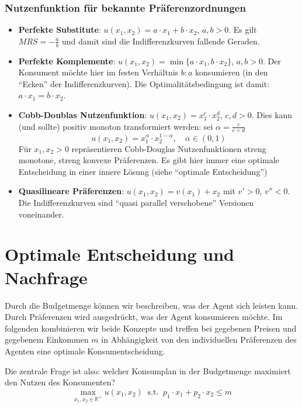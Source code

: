 \subsubsection*{Nutzenfunktion für bekannte Präferenzordnungen}
\begin{itemize}
	\item \textbf{Perfekte Substitute}: $u(x_1, x_2) = a \cdot x_1 + b \cdot x_2$, $a, b > 0$. Es gilt $MRS = - \frac{a}{b}$ und damit sind die Indifferenzkurven fallende Geraden.
	\item \textbf{Perfekte Komplemente}: $u(x_1, x_2) = \min \{ a \cdot x_1, b \cdot x_2 \}$, $a, b > 0$. Der Konsument möchte hier im festen Verhältnis $b : a$ konsumieren (in den \enquote{Ecken} der Indifferenzkurven). Die Optimalitätsbedingung ist damit: $a \cdot x_1 = b \cdot x_2$.
	\item \textbf{Cobb-Doublas Nutzenfunktion}: $u(x_1, x_2) = x_1^c \cdot x_2^d$, $c, d > 0$. Dies kann (und sollte) positiv monoton transformiert werden: sei $\alpha = \frac{c}{c + d}$
		$$ u(x_1, x_2) = x_1^{\alpha} \cdot x_2^{1 - \alpha}, \quad \alpha \in (0, 1) $$
		Für $x_1, x_2 > 0$ repräsentieren Cobb-Douglas Nutzenfunktionen streng monotone, streng konvexe Präferenzen. Es gibt hier immer eine optimale Entscheidung in einer innere Lösung (siehe \enquote{optimale Entscheidung})
	\item \textbf{Quasilineare Präferenzen}: $u(x_1, x_2) = v(x_1) + x_2$ mit $v' > 0$, $v'' < 0$. Die Indifferenzkurven sind \enquote{quasi parallel verschobene} Versionen voneinander.
\end{itemize}

\section{Optimale Entscheidung und Nachfrage}

Durch die Budgetmenge können wir beschreiben, was der Agent sich leisten kann. Durch Präferenzen wird ausgedrückt, was der Agent konsumieren möchte. Im folgenden kombinieren wir beide Konzepte und treffen bei gegebenen Preisen und gegebenem Einkommen $m$ in Abhängigkeit von den individuellen Präferenzen des Agenten eine optimale Konsumentscheidung. ~\bigskip

Die zentrale Frage ist also: welcher Konsumplan in der Budgetmenge maximiert den Nutzen des Konsumenten?
	$$ \max_{x_1, x_2 \in \mathbb{R}^+} u(x_1, x_2) ~\text{ s.t. }~ p_1 \cdot x_1 + p_2 \cdot x_2 \leq m $$ 
	
